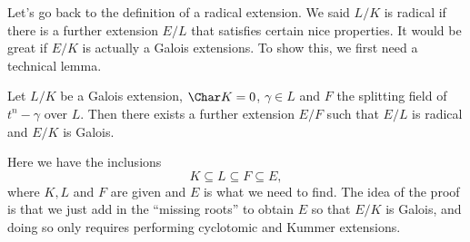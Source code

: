 \documentclass[a4paper]{article}
\begin{document}
Let's go back to the definition of a radical extension. We said $L/K$ is radical if there is a further extension $E/L$ that satisfies certain nice properties. It would be great if $E/K$ is actually a Galois extensions. To show this, we first need a technical lemma.
\begin{lemma}
  Let $L/K$ be a Galois extension, $\Char K = 0$, $\gamma \in L$ and $F$ the splitting field of $t^n - \gamma$ over $L$. Then there exists a further extension $E/F$ such that $E/L$ is radical and $E/K$ is Galois.
\end{lemma}
Here we have the inclusions
\[
  K\subseteq L \subseteq F \subseteq E,
\]
where $K, L$ and $F$ are given and $E$ is what we need to find. The idea of the proof is that we just add in the ``missing roots'' to obtain $E$ so that $E/K$ is Galois, and doing so only requires performing cyclotomic and Kummer extensions.
\end{document}
